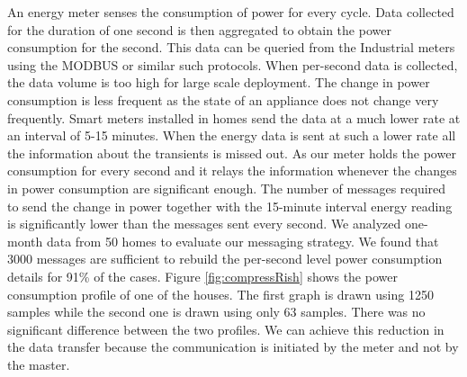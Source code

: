 An energy meter senses the consumption of power for every cycle. Data collected for the duration of one second is then aggregated to obtain the power consumption for the second. This data can be queried from the Industrial meters using the MODBUS or similar such protocols. When per-second data is collected, the data volume is too high for large scale deployment. The change in power consumption is less frequent as the state of an appliance does not change very frequently. Smart meters installed in homes send the data at a much lower rate at an interval of 5-15 minutes. When the energy data is sent at such a lower rate all the information about the transients is missed out. As our meter holds the power consumption for every second and it relays the information whenever the changes in power consumption are significant enough. The number of messages required to send the change in power together with the 15-minute interval energy reading is significantly lower than the messages sent every second. We analyzed one-month data from 50 homes to evaluate our messaging strategy. We found that 3000 messages are sufficient to rebuild the per-second level power consumption details for 91\% of the cases. Figure \ref{fig:compressRish} shows the power consumption profile of one of the houses. The first graph is drawn using 1250 samples while the second one is drawn using only 63 samples. There was no significant difference between the two profiles. We can achieve this reduction in the data transfer because the communication is initiated by the meter and not by the master.

